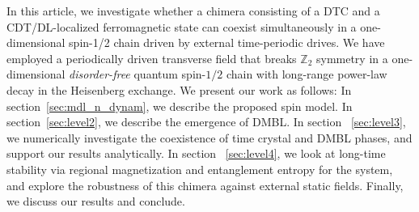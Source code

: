 \documentclass[%
nofootinbib,
reprint,
superscriptaddress,
amsmath,amssymb,showkeys,
aps,
prb,
]{revtex4-2}
\begin{document}
	In this article, we investigate whether a chimera consisting of a DTC and a CDT/DL-localized ferromagnetic state can coexist simultaneously in a one-dimensional spin-1/2 chain driven by external time-periodic drives. We have employed a periodically driven transverse field that breaks $\mathbb{Z}_2$ symmetry in a one-dimensional \textit{disorder-free} quantum spin-$1/2$ chain with long-range power-law decay in the Heisenberg exchange. We present our work as follows: In section~\ref{sec:mdl_n_dynam}, we describe the proposed spin model. In section~\ref{sec:level2}, we describe the emergence of DMBL. In section ~\ref{sec:level3}, we numerically investigate the coexistence of time crystal and DMBL phases, and support our results analytically. In section ~\ref{sec:level4}, we look at long-time stability via regional magnetization and  entanglement entropy for the system, and explore the robustness of this chimera against  external static fields. Finally, we discuss our results and conclude.	
	
\end{document}
